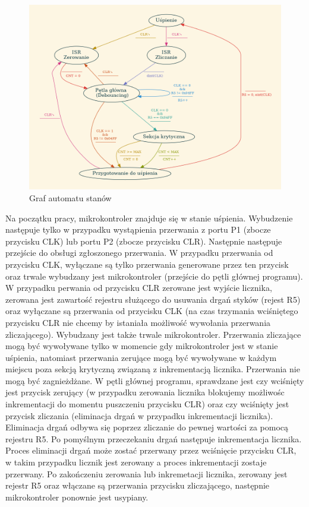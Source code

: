 \documentclass[fleqn]{article}
\begin{document}
\begin{figure}[H]
	\centering
	\includegraphics[width=\textwidth]{assets/graph.png}
	\caption{Graf automatu stanów}
	\label{fig:graph}
\end{figure}


Na początku pracy, mikrokontroler znajduje się w stanie uśpienia. Wybudzenie następuje tylko w przypadku wystąpienia przerwania z portu P1 (zbocze przycisku CLK) lub portu P2 (zbocze przycisku CLR). Następnie następuje przejście do obsługi zgłoszonego przerwania. W przypadku przerwania od przycisku CLK, wyłączane są tylko przerwania generowane przez ten przycisk oraz trwale wybudzany jest mikrokontroler (przejście do pętli głównej programu). W przypadku perwania od przycisku CLR zerowane jest wyjście licznika, zerowana jest zawartość rejestru służącego do usuwania drgań styków (rejest R5) oraz wyłączane są przerwania od przycisku CLK (na czas trzymania wciśniętego przycisku CLR nie chcemy by istaniała możliwość wywołania przerwania zliczającego). Wybudzany jest także trwale mikrokontroler. Przerwania zliczające mogą być wywoływane tylko w momencie gdy mikrokontroler jest w stanie uśpienia, natomiast przerwania zerujące mogą być wywoływane w każdym miejscu poza sekcją krytyczną związaną z inkrementacją licznika. Przerwania nie mogą być zagnieżdżane. W pętli głównej programu, sprawdzane jest czy wciśnięty jest przycisk zerujący (w przypadku zerowania licznika blokujemy możliwośc inkrementacji do momentu puszczeniu przycisku CLR) oraz czy wciśnięty jest przycisk zliczania (eliminacja drgań w przypadku inkrementacji licznika). Eliminacja drgań odbywa się poprzez zliczanie do pewnej wartości za pomocą rejestru R5. Po pomyślnym przeczekaniu drgań następuje inkrementacja licznika. Proces eliminacji drgań może zostać przerwany przez wciśnięcie przycisku CLR, w takim przypadku licznik jest zerowany a proces inkrementacji zostaje przerwany. Po zakończeniu zerowania lub inkremetacji licznika, zerowany jest rejestr R5 oraz włączane są przerwania przycisku zliczającego, następnie mikrokontroler ponownie jest usypiany.
\end{document}
